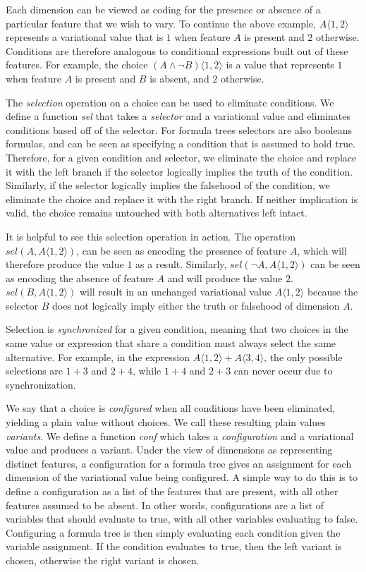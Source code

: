 \documentclass[onehalf,11pt]{beavtex}
\newcommand{\tagtree}[3]{#1 \langle #2, #3 \rangle}
\begin{document}
Each dimension can be viewed as coding for the presence or absence of a
particular feature that we wish to vary. To continue the above example, $\tagtree{A}{1}{2}$
represents a variational value that is $1$ when feature $A$ is present and $2$ otherwise. Conditions
are therefore analogous to conditional expressions built out of these features. For example, the choice $\tagtree{(A \wedge \neg B)}{1}{2}$
is a value that represents $1$ when feature $A$ is present and $B$ is absent, and $2$ otherwise.

The \emph{selection} operation on a choice can be used to eliminate conditions. We define a function
\emph{sel} that takes a \emph{selector} and a variational value and eliminates conditions based off
of the selector. For formula trees selectors are also booleans formulas, and can be seen as specifying
a condition that is assumed to hold true. Therefore, for a given condition and
selector, we eliminate the choice and replace it with the left branch if the selector logically implies
the truth of the condition. Similarly, if the selector logically implies the falsehood of the condition, we eliminate the choice
and replace it with the right branch. If neither implication is valid, the choice remains untouched with
both alternatives left intact.

It is helpful to see this selection operation in action. The operation
$\mathit{sel}(A,\tagtree{A}{1}{2})$, can be seen as encoding the presence of feature $A$, which
will therefore produce the value $1$ as a result. Similarly, $\mathit{sel}(\neg A,\tagtree{A}{1}{2})$ can be seen as encoding the absence of feature $A$ and will
produce the value $2$. $\mathit{sel}(B,\tagtree{A}{1}{2})$ will result in an unchanged variational
value $\tagtree{A}{1}{2}$ because the selector $B$ does not logically imply either the truth or falsehood
of dimension $A$.

Selection is \emph{synchronized} for a given
condition, meaning that two choices in the same value or expression that share a condition must always
select the same alternative. For example, in the expression $\tagtree{A}{1}{2}+\tagtree{A}{3}{4}$,
the only possible selections are $1+3$ and $2+4$, while $1+4$ and $2+3$ can never occur due
to synchronization.

We say that a choice is \emph{configured} when all conditions
have been eliminated, yielding a plain value without choices. We call these resulting plain values
\emph{variants}. We define a function \emph{conf} which takes a
\emph{configuration} and a variational value and produces a variant. Under the view of dimensions as representing distinct features, a configuration for a formula tree gives
an assignment for each dimension of the variational value being configured.
A simple way to do this is to define a configuration as a list of the features that are present, with all
other features assumed to be absent. In other words, configurations are a list of variables that should
evaluate to true, with all other variables evaluating to false. Configuring a formula tree is then simply evaluating
each condition given the variable assignment. If the condition evaluates to true, then the left variant
is chosen, otherwise the right variant is chosen.
\end{document}

